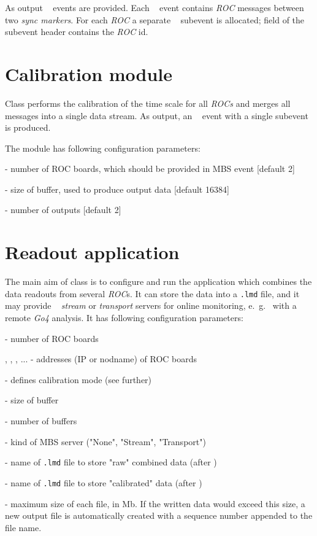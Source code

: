 As output \mbs~ events are provided. Each \mbs~ event contains {\em ROC} messages between two {\em sync markers}.
For each {\em ROC} a separate \mbs~ subevent is allocated; 
field  of the subevent header contains the {\em ROC} id.


\section{Calibration module}

Class  performs the calibration of the time scale for all
{\em ROCs} and merges all messages into a single data stream. 
As output, an \mbs~ event with a single
subevent is produced. 

The module has following configuration parameters:
\bbul
\item {}     - number of ROC boards, which should be provided in MBS event [default 2]  
\item {}  - size of buffer, used to produce output data [default 16384]
\item {}  - number of outputs [default 2]
\ebul
 

\section{Readout application}

The main aim of  class is to configure and run 
the application which combines the data readouts from several {\em ROC}s.
It can store the data into a {\tt \*.lmd} file, and it  
may provide  \mbs~ {\em stream} or {\em transport} servers 
for online monitoring, e.~g.~ with a remote {\em Go4} analysis.
It has following configuration parameters:

\bbul
\item {}   - number of ROC boards  
\item {}, , , ... - addresses (IP or nodname) of ROC boards
\item {}  - defines calibration mode (see further)
\item {} - size of buffer
\item {} - number of buffers
\item {} - kind of MBS server ("None", "Stream", "Transport")
\item {} - name of {\tt \*.lmd} file to store "raw" combined data (after
)
\item {} - name of {\tt \*.lmd} file to store "calibrated" data (after
)
\item {} - maximum size of each file, in Mb. If the written data 
would exceed this size, a new output file is automatically created with a sequence number appended to the file name.
\ebul

